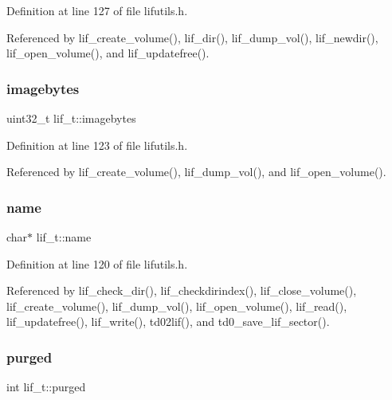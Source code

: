 Definition at line 127 of file lifutils.\+h.



Referenced by lif\+\_\+create\+\_\+volume(), lif\+\_\+dir(), lif\+\_\+dump\+\_\+vol(), lif\+\_\+newdir(), lif\+\_\+open\+\_\+volume(), and lif\+\_\+updatefree().

\mbox{\label{structlif__t_afabd64e66adb03eef2249b6c627faac7}} 
\subsubsection{\texorpdfstring{imagebytes}{imagebytes}}
{\footnotesize\ttfamily uint32\+\_\+t lif\+\_\+t\+::imagebytes}



Definition at line 123 of file lifutils.\+h.



Referenced by lif\+\_\+create\+\_\+volume(), lif\+\_\+dump\+\_\+vol(), and lif\+\_\+open\+\_\+volume().

\mbox{\label{structlif__t_ae6b943f3c26005fc375169960e9049f7}} 
\subsubsection{\texorpdfstring{name}{name}}
{\footnotesize\ttfamily char$\ast$ lif\+\_\+t\+::name}



Definition at line 120 of file lifutils.\+h.



Referenced by lif\+\_\+check\+\_\+dir(), lif\+\_\+checkdirindex(), lif\+\_\+close\+\_\+volume(), lif\+\_\+create\+\_\+volume(), lif\+\_\+dump\+\_\+vol(), lif\+\_\+open\+\_\+volume(), lif\+\_\+read(), lif\+\_\+updatefree(), lif\+\_\+write(), td02lif(), and td0\+\_\+save\+\_\+lif\+\_\+sector().

\mbox{\label{structlif__t_a1dfef3ca99d6ba9680bb9b6bf8fafc32}} 
\subsubsection{\texorpdfstring{purged}{purged}}
{\footnotesize\ttfamily int lif\+\_\+t\+::purged}



